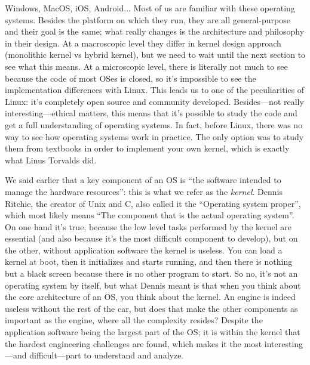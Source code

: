 \documentclass[10pt]{book}
\begin{document}
Windows, MacOS, iOS, Android... Most of us are familiar with these operating systems. Besides the platform on which they run, they are all general-purpose and their goal is the same; what really changes is the architecture and philosophy in their design. At a macroscopic level they differ in kernel design approach (monolithic kernel vs hybrid kernel), but we need to wait until the next section to see what this means. At a microscopic level, there is literally not much to see because the code of most OSes is closed, so it's impossible to see the implementation differences with Linux. This leads us to one of the peculiarities of Linux: it's completely open source and community developed. Besides---not really interesting---ethical matters, this means that it's possible to study the code and get a full understanding of operating systems. In fact, before Linux, there was no way to see how operating systems work in practice. The only option was to study them from textbooks in order to implement your own kernel, which is exactly what Linus Torvalds did.

We said earlier that a key component of an OS is ``the software intended to manage the hardware resources'': this is what we refer as the \textit{kernel}. Dennis Ritchie, the creator of Unix and C, also called it the ``Operating system proper''\cite{ritchie}, which most likely means ``The component that is the actual operating system''. On one hand it's true, because the low level tasks performed by the kernel are essential (and also because it's the most difficult component to develop), but on the other, without application software the kernel is useless. You can load a kernel at boot, then it initializes and starts running, and then there is nothing but a black screen because there is no other program to start. So no, it's not an operating system by itself, but what Dennis meant is that when you think about the core architecture of an OS, you think about the kernel. An engine is indeed useless without the rest of the car, but does that make the other components as important as the engine, where all the complexity resides? Despite the application software being the largest part of the OS; it is within the kernel that the hardest engineering challenges are found, which makes it the most interesting---and difficult---part to understand and analyze.
\end{document}
